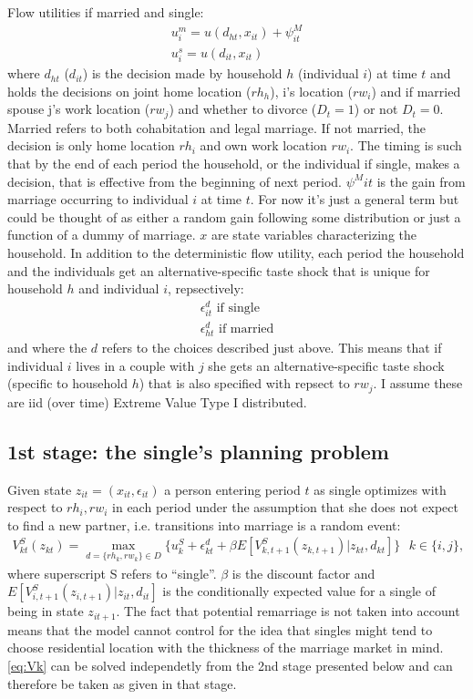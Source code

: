 Flow utilities if married and single: 
\begin{align*}
u_i^m = u(d_{ht},x_{it})+\psi^M_{it} \\
u_i^s = u(d_{it},x_{it})
\end{align*}
where $d_{ht}$ ($d_{it}$) is the decision made by household $h$ (individual $i$) at time $t$ and holds the decisions on joint home location ($rh_h$), i's location ($rw_i$) and if married spouse j's work location ($rw_j$) and whether to divorce ($D_t=1$) or not $D_t=0$. Married refers to both cohabitation and legal marriage. If not married, the decision is only home location $rh_i$ and own work location $rw_i$. The timing is such that by the end of each period the household, or the individual if single, makes a decision, that is effective from the beginning of next period. $\psi^M{it}$ is the gain from marriage occurring to individual $i$ at time $t$. For now it's just a general term but could be thought of as either a random gain following some distribution or just a function of a dummy of marriage. $x$ are state variables characterizing the household. In addition to the deterministic flow utility, each period the household and the individuals get an alternative-specific taste shock that is unique for household $h$ and individual $i$, repsectively:
\begin{align*}
\epsilon_{it}^d \text{ if single} \\
\epsilon_{ht}^d \text{ if married} 
\end{align*}
and where the $d$ refers to the choices described just above. This means that if individual $i$ lives in a couple with $j$ she gets an alternative-specific taste shock (specific to household $h$) that is also specified with repsect to $rw_j$. I assume these are iid (over time) Extreme Value Type I distributed. 

\subsection{1st stage: the single's planning problem}
Given state $z_{it}=(x_{it},\epsilon_{it})$ a person entering period $t$ as single optimizes with respect to $rh_i,rw_i$ in each period under the assumption that she does not expect to find a new partner, i.e. transitions into marriage is a random event:
\begin{align*}
V_{kt}^S(z_{kt})= \max_{d=\{rh_k,rw_k\}\in D}\{u_k^S+\epsilon_{kt}^d+\beta E[V_{k,t+1}^S(z_{k,t+1})|z_{kt},d_{kt}]\} \text{ }k\in\{i,j\},
\label{eq:Vk}
\end{align*}
where superscript S refers to ``single''. $\beta$ is the discount factor and $E[V_{i,t+1}^S(z_{i,t+1})|z_{it},d_{it}]$ is the conditionally expected value for a single of being in state $z_{it+1}$. The fact that potential remarriage is not taken into account means that the model cannot control for the idea that singles might tend to choose residential location with the thickness of the marriage market in mind. \eqref{eq:Vk} can be solved independetly from the 2nd stage presented below and can therefore be taken as given in that stage.

